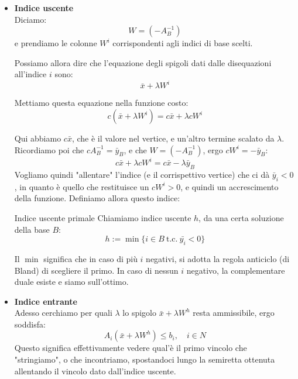 \documentclass[a4paper,11pt]{article}
\begin{document}
\begin{itemize}
	\item \textbf{\textsf{Indice uscente}} \\
Diciamo:
$$
W = \left( -A_B^{-1} \right)
$$
e prendiamo le colonne $W^i$ corrispondenti agli indici di base scelti.

Possiamo allora dire che l'equazione degli spigoli dati dalle disequazioni all'indice $i$ sono:
$$
\bar{x} + \lambda W^i
$$

Mettiamo questa equazione nella funzione costo:
$$
c\left( \bar{x} + \lambda W^i \right) = c \bar{x} + \lambda c W^{i}
$$

Qui abbiamo $c\bar{x}$, che è il valore nel vertice, e un'altro termine scalato da $\lambda$.
Ricordiamo poi che $cA_B^{-1} = \bar{y}_B$, e che $W = \left( -A_B^{-1} \right)$, ergo $c W^{i} = -\bar{y}_B$:
$$
c \bar{x} + \lambda c W^{i} = c \bar{x} - \lambda \bar{y}_B
$$
Vogliamo quindi "allentare" l'indice (e il corrispettivo vertice) che ci dà $\bar{y}_i < 0$, in quanto è quello che restituisce un $c W^{i} > 0$, e quindi un accrescimento della funzione. 
Definiamo allora questo indice:
\begin{definition}{Indice uscente primale}
Chiamiamo indice uscente $h$, da una certa soluzione della base $B$:
$$h := \min\{ i \in B \ \text{t.c.} \ \bar{y_i} < 0  \}$$
\end{definition}
Il $\min$ significa che in caso di più $i$ negativi, si adotta la regola anticiclo (di Bland) di scegliere il primo.
In caso di nessun $i$ negativo, la complementare duale esiste e siamo sull'ottimo.

	\item \textbf{\textsf{Indice entrante}} \\
Adesso cerchiamo per quali $\lambda$ lo spigolo $\bar{x} + \lambda W^h$ resta ammissibile, ergo soddisfa:
$$
A_i \left( \bar{x} + \lambda W^h \right) \leq b_i, \quad i \in N 
$$
Questo significa effettivamente vedere qual'è il primo vincolo che "stringiamo", o che incontriamo, spostandoci lungo la semiretta ottenuta allentando il vincolo dato dall'indice uscente.


\end{itemize}
\end{document}
